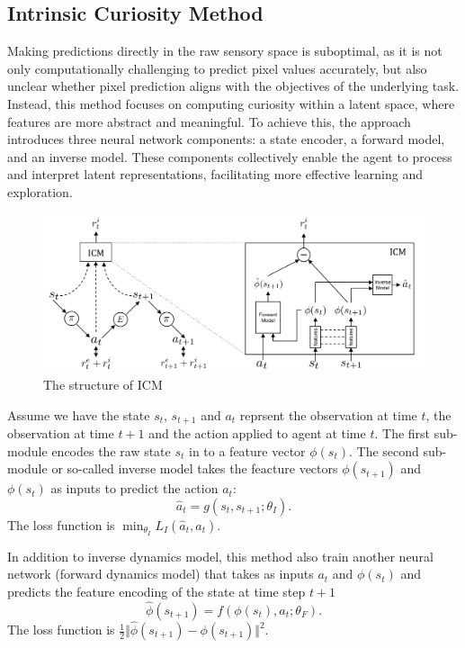 \documentclass{article}
\begin{document}
\subsection{Intrinsic Curiosity Method}
Making predictions directly in the raw sensory space is suboptimal, as it is not only computationally challenging to predict pixel values accurately, but also unclear whether pixel prediction aligns with the objectives of the underlying task. Instead, this method focuses on computing curiosity within a latent space, where features are more abstract and meaningful. To achieve this, the approach introduces three neural network components: a state encoder, a forward model, and an inverse model. These components collectively enable the agent to process and interpret latent representations, facilitating more effective learning and exploration.
\begin{figure}
	\centering
	\includegraphics[width=0.5\linewidth]{figure/ICM_structure.png}
	\caption{The structure of ICM}
	\label{fig:enter-label}
\end{figure}
Assume we have the state $s_t$, $s_{t+1}$ and $a_t$ reprsent the observation at time $t$, the observation at time $t+1$ and the action applied to agent at time $t$.
The first sub-module encodes the raw state $s_t$ in to a feature vector $\phi(s_t)$. The second sub-module or so-called inverse model takes the feacture vectors $\phi(s_{t+1})$ and $\phi(s_t)$ as inputs to predict the action $a_t$:
\[
\hat{a}_t=g\left(s_t,s_{t+1};\theta_I \right).
\]
The loss function is $\min_{\theta_I}L_I(\hat{a}_t,a_t)$.

In addition to inverse dynamics model, this method also train another neural network (forward dynamics model) that takes as inputs $a_t$ and $\phi(s_t)$ and predicts the feature encoding of the state at time step $t+1$
\[
\hat{\phi}(s_{t+1}) = f\left(\phi(s_t),a_t;\theta_F\right).
\]
The loss function is $\frac{1}{2}\Vert \hat{\phi}(s_{t+1})-\phi(s_{t+1})\Vert^2$.
\end{document}
